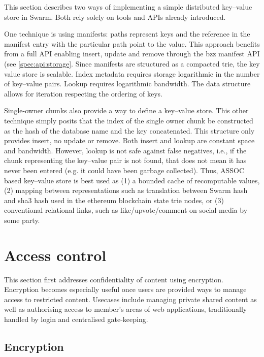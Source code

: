 This section describes two ways of implementing a simple distributed key--value store in Swarm. Both rely solely on tools and APIs  already introduced.

One technique is using manifests: paths represent keys and the reference in the manifest entry with the particular path point to  the  value. This approach benefits from a full API enabling insert, update and remove through the bzz manifest API (see \ref{spec:api:storage}. Since manifests are structured as a compacted trie, the key value store is scalable. Index metadata requires storage logarithmic in the number of key--value pairs. Lookup requires logarithmic bandwidth. The data structure allows for iteration respecting the ordering of keys. 

Single-owner chunks also provide a way to define a key--value store. 
This other technique simply posits that the index of the single owner chunk be constructed as the hash of the database name and the key concatenated. This structure only provides insert, no update or remove. Both insert and lookup are constant  space and bandwidth. However,  lookup is not safe against false negatives, i.e., if the chunk representing the key--value pair is not found,  that does not mean it has never been entered (e.g. it could have been garbage collected). Thus, ASSOC based key--value store    is best used as (1) a bounded cache of recomputable values, (2) mapping between representations such  as translation between Swarm hash and sha3 hash used in the ethereum blockchain state trie nodes, or (3) conventional relational links, such as like/upvote/comment on social media by some party. 


\section{Access control}\label{sec:access-control}

This section first addresses confidentiality of content using encryption. Encryption becomes especially useful once users are provided ways to manage access to restricted content. Usecases include managing private shared content as well as authorising access to member's areas of web applications, traditionally handled by login and centralised gate-keeping.

\subsection{Encryption}\label{sec:encryption}


